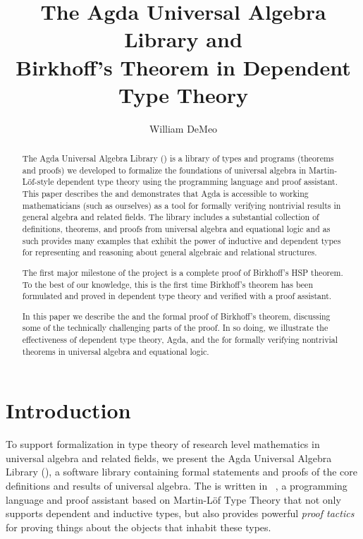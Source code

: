 \documentclass[a4paper,UKenglish,cleveref,autoref,thm-restate]{lipics-v2021}
\title{The Agda Universal Algebra Library and\\ Birkhoff's Theorem in Dependent Type Theory}
\author{William DeMeo}
       {Department of Algebra, Charles University in Prague \and \url{https://williamdemeo.gitlab.io}}
       {williamdemeo@gmail.com}
       {https://orcid.org/0000-0003-1832-5690}
       {}
\begin{document}
\maketitle


\begin{abstract}
The Agda Universal Algebra Library (\ualib) is a library of types and programs (theorems and proofs) we developed to formalize the foundations of universal algebra in Martin-Löf-style dependent type theory using the \agda programming language and proof assistant. This paper describes the \ualib and demonstrates that Agda is accessible to working mathematicians (such as ourselves) as a tool for formally verifying nontrivial results in general algebra and related fields. The library includes a substantial collection of definitions, theorems, and proofs from universal algebra and equational logic and as such provides many examples that exhibit the power of inductive and dependent types for representing and reasoning about general algebraic and relational structures.

The first major milestone of the \ualib project is a complete proof of Birkhoff's HSP theorem. To the best of our knowledge, this is the first time Birkhoff's theorem has been formulated and proved in dependent type theory and verified with a proof assistant.

In this paper we describe the \agdaualib and the formal proof of Birkhoff's theorem, discussing some of the technically challenging parts of the proof. In so doing, we illustrate the effectiveness of dependent type theory, Agda, and the \ualib for formally verifying nontrivial theorems in universal algebra and equational logic.
\end{abstract}



\section{Introduction}\label{sec:introduction}
To support formalization in type theory of research level mathematics in universal algebra and related fields, we present the Agda Universal Algebra Library (\agdaualib), a software library containing formal statements and proofs of the core definitions and results of universal algebra. 
The \agdaualib is written in \agda~\cite{Norell:2009}, a programming language and proof assistant based on Martin-L\"of Type Theory that not only supports dependent and inductive types, but also provides powerful \emph{proof tactics} for proving things about the objects that inhabit these types.
\end{document}
